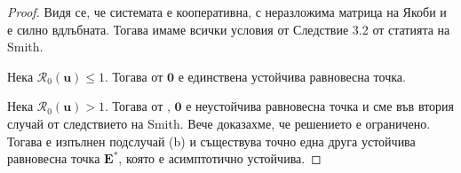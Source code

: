 \begin{proof}
  Видя се, че системата е кооперативна, с неразложима матрица на Якоби и е силно вдлъбната. Тогава имаме всички условия от Следствие 3.2 от статията \cite{Smith1986} на Smith.

  Нека $\mathscr{R}_0(\mathbf{u}) \leq 1$. Тогава от \cite{Driessche2002} $\mathbf{0}$ е единствена устойчива равновесна точка.

  Нека $\mathscr{R}_0(\mathbf{u}) > 1$. Тогава от \cite{Driessche2002}, $\mathbf{0}$ е неустойчива равновесна точка и сме във втория случай от следствието на Smith. Вече доказахме, че решението е ограничено. Тогава е изпълнен подслучай (b) и съществува точно една друга устойчива равновесна точка $\mathbf{E}^*$, която е асимптотично устойчива.
\end{proof}


